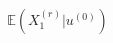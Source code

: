 \documentclass[preview]{standalone}
\begin{document}
\begin{align*}
\mathbb{E}(X^{(r)}_1|u^{(0)})
\end{align*}
\end{document}
